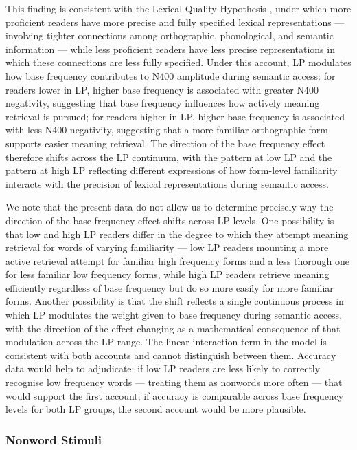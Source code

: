 \documentclass[utf8]{FrontiersinHarvard} %
\begin{document}
	This finding is consistent with the Lexical Quality Hypothesis \citep{Perfetti2007}, under which more proficient readers have more precise and fully specified lexical representations --- involving tighter connections among orthographic, phonological, and semantic information --- while less proficient readers have less precise representations in which these connections are less fully specified. Under this account, LP modulates how base frequency contributes to N400 amplitude during semantic access: for readers lower in LP, higher base frequency is associated with greater N400 negativity, suggesting that base frequency influences how actively meaning retrieval is pursued; for readers higher in LP, higher base frequency is associated with less N400 negativity, suggesting that a more familiar orthographic form supports easier meaning retrieval. The direction of the base frequency effect therefore shifts across the LP continuum, with the pattern at low LP and the pattern at high LP reflecting different expressions of how form-level familiarity interacts with the precision of lexical representations during semantic access.
	
	We note that the present data do not allow us to determine precisely why the direction of the base frequency effect shifts across LP levels. One possibility is that low and high LP readers differ in the degree to which they attempt meaning retrieval for words of varying familiarity --- low LP readers mounting a more active retrieval attempt for familiar high frequency forms and a less thorough one for less familiar low frequency forms, while high LP readers retrieve meaning efficiently regardless of base frequency but do so more easily for more familiar forms. Another possibility is that the shift reflects a single continuous process in which LP modulates the weight given to base frequency during semantic access, with the direction of the effect changing as a mathematical consequence of that modulation across the LP range. The linear interaction term in the model is consistent with both accounts and cannot distinguish between them. Accuracy data would help to adjudicate: if low LP readers are less likely to correctly recognise low frequency words --- treating them as nonwords more often --- that would support the first account; if accuracy is comparable across base frequency levels for both LP groups, the second account would be more plausible.
	
	
	\subsubsection{Nonword Stimuli}
	
\end{document}
